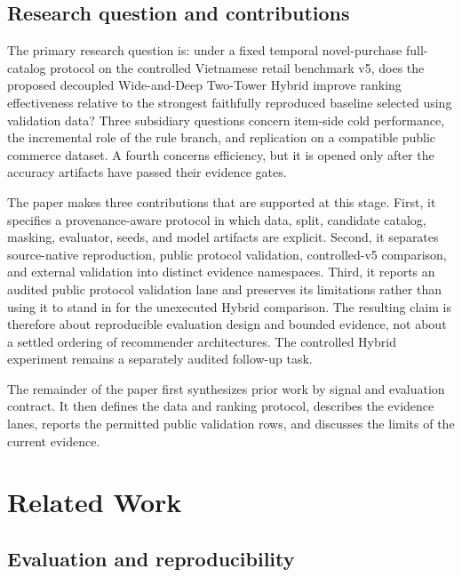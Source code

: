\documentclass[10pt,a4paper]{article}
\begin{document}
\subsection{Research question and contributions}

The primary research question is: under a fixed temporal novel-purchase
full-catalog protocol on the controlled Vietnamese retail benchmark v5, does
the proposed decoupled Wide-and-Deep Two-Tower Hybrid improve ranking
effectiveness relative to the strongest faithfully reproduced baseline selected
using validation data? Three subsidiary questions concern item-side cold
performance, the incremental role of the rule branch, and replication on a
compatible public commerce dataset. A fourth concerns efficiency, but it is
opened only after the accuracy artifacts have passed their evidence gates.

The paper makes three contributions that are supported at this stage. First, it
specifies a provenance-aware protocol in which data, split, candidate catalog,
masking, evaluator, seeds, and model artifacts are explicit. Second, it separates
source-native reproduction, public protocol validation, controlled-v5 comparison,
and external validation into distinct evidence namespaces. Third, it reports an
audited public protocol validation lane and preserves its limitations rather
than using it to stand in for the unexecuted Hybrid comparison. The resulting
claim is therefore about reproducible evaluation design and bounded evidence,
not about a settled ordering of recommender architectures. The controlled
Hybrid experiment remains a separately audited follow-up task.

The remainder of the paper first synthesizes prior work by signal and evaluation
contract. It then defines the data and ranking protocol, describes the evidence
lanes, reports the permitted public validation rows, and discusses the limits of
the current evidence.

\section{Related Work}

\subsection{Evaluation and reproducibility}
\end{document}
